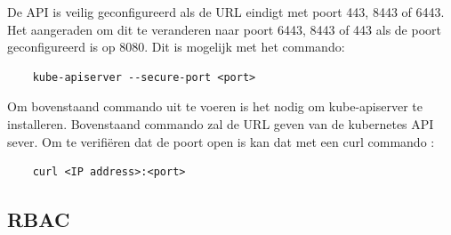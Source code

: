 De API is veilig geconfigureerd als de URL eindigt met poort 443, 8443 of 6443. Het aangeraden om dit te veranderen naar poort 6443, 8443 of 443 als de poort geconfigureerd is op 8080. Dit is mogelijk met het commando:
\begin{verbatim}
    kube-apiserver --secure-port <port>
\end{verbatim}

Om bovenstaand commando uit te voeren is het nodig om kube-apiserver te installeren. 
Bovenstaand commando zal de URL geven van de kubernetes API sever. Om te verifiëren dat de poort open is kan dat met een curl commando \autocite{Rice2018}:
\begin{verbatim}
    curl <IP address>:<port>
\end{verbatim}


\subsection{RBAC}
